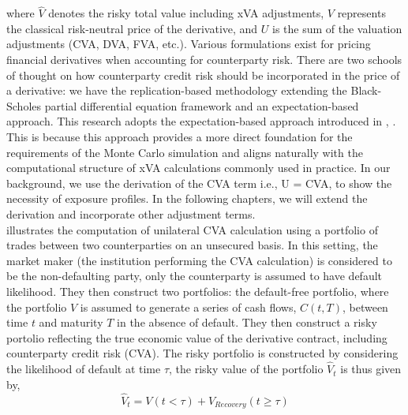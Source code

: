     where $\hat{V}$ denotes the risky total value including xVA adjustments, $V$ represents the classical risk-neutral price of the derivative, and $U$ is the sum of the valuation adjustments (CVA, DVA, FVA, etc.). Various formulations exist for pricing financial derivatives when accounting for counterparty risk. There are two schools of thought on how counterparty credit risk should be incorporated in the price of a derivative: we have the replication-based methodology extending the Black-Scholes partial differential equation framework and an expectation-based approach. This research adopts the expectation-based approach introduced in \cite{grzelak2021sparse}, \cite{Tsuchiya_2019}. This is because this approach provides a more direct foundation for the requirements of the Monte Carlo simulation and aligns naturally with the computational structure of xVA calculations commonly used in practice. In our background, we use the derivation of the CVA term i.e., U = CVA, to show the necessity of exposure profiles. In the following chapters, we will extend the derivation and incorporate other adjustment terms. \\

\noindent 
    \cite{Green_2016} illustrates the computation of unilateral CVA calculation using a portfolio of trades between two counterparties on an unsecured basis. In this setting, the market maker (the institution performing the CVA calculation) is considered to be the non-defaulting party, only the counterparty is assumed to have default likelihood. They then construct two portfolios: the default-free portfolio, where the portfolio $V$ is assumed to generate a series of cash flows, $C(t,T)$, between time $t$ and maturity $T$ in the absence of default. They then construct a risky portolio reflecting the true economic value of the derivative contract, including counterparty credit risk (CVA). The risky portfolio is constructed by considering the likelihood of default at time $\tau$, the risky value of the portfolio $\hat{V}_t$ is thus given by, \\
    
    \begin{equation}\label{eq:riskyvalue}
        \hat{V}_t = V(t < \tau) + V_{Recovery}(t \geq \tau)
    \end{equation}  

